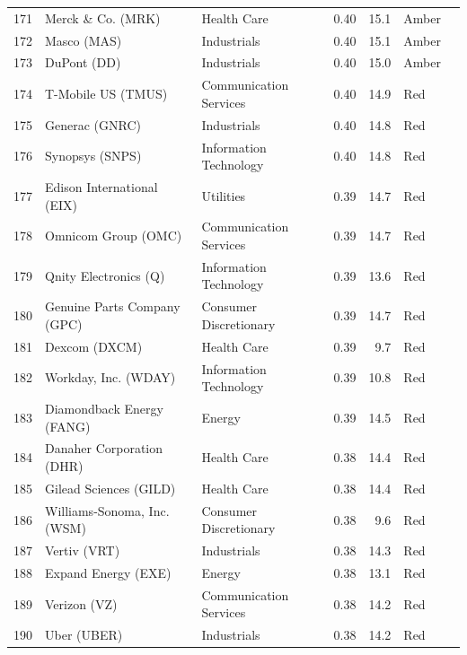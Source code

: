 \documentclass[11pt,a4paper]{article}
\begin{document}
{\begin{longtable}{r p{4.4cm} p{2.8cm} r r l l}
171 & Merck \& Co. (MRK) & Health Care & 0.40 & 15.1 & \cellcolor[HTML]{FFEB9C}Amber &  \\
172 & Masco (MAS) & Industrials & 0.40 & 15.1 & \cellcolor[HTML]{FFEB9C}Amber &  \\
173 & DuPont (DD) & Industrials & 0.40 & 15.0 & \cellcolor[HTML]{FFEB9C}Amber &  \\
174 & T-Mobile US (TMUS) & Communication Services & 0.40 & 14.9 & \cellcolor[HTML]{F4B6B6}Red &  \\
175 & Generac (GNRC) & Industrials & 0.40 & 14.8 & \cellcolor[HTML]{F4B6B6}Red &  \\
176 & Synopsys (SNPS) & Information Technology & 0.40 & 14.8 & \cellcolor[HTML]{F4B6B6}Red &  \\
177 & Edison International (EIX) & Utilities & 0.39 & 14.7 & \cellcolor[HTML]{F4B6B6}Red &  \\
178 & Omnicom Group (OMC) & Communication Services & 0.39 & 14.7 & \cellcolor[HTML]{F4B6B6}Red &  \\
179 & Qnity Electronics (Q) & Information Technology & 0.39 & 13.6 & \cellcolor[HTML]{F4B6B6}Red &  \\
180 & Genuine Parts Company (GPC) & Consumer Discretionary & 0.39 & 14.7 & \cellcolor[HTML]{F4B6B6}Red &  \\
181 & Dexcom (DXCM) & Health Care & 0.39 & 9.7 & \cellcolor[HTML]{F4B6B6}Red &  \\
182 & Workday, Inc. (WDAY) & Information Technology & 0.39 & 10.8 & \cellcolor[HTML]{F4B6B6}Red &  \\
183 & Diamondback Energy (FANG) & Energy & 0.39 & 14.5 & \cellcolor[HTML]{F4B6B6}Red &  \\
184 & Danaher Corporation (DHR) & Health Care & 0.38 & 14.4 & \cellcolor[HTML]{F4B6B6}Red &  \\
185 & Gilead Sciences (GILD) & Health Care & 0.38 & 14.4 & \cellcolor[HTML]{F4B6B6}Red &  \\
186 & Williams-Sonoma, Inc. (WSM) & Consumer Discretionary & 0.38 & 9.6 & \cellcolor[HTML]{F4B6B6}Red &  \\
187 & Vertiv (VRT) & Industrials & 0.38 & 14.3 & \cellcolor[HTML]{F4B6B6}Red &  \\
188 & Expand Energy (EXE) & Energy & 0.38 & 13.1 & \cellcolor[HTML]{F4B6B6}Red &  \\
189 & Verizon (VZ) & Communication Services & 0.38 & 14.2 & \cellcolor[HTML]{F4B6B6}Red &  \\
190 & Uber (UBER) & Industrials & 0.38 & 14.2 & \cellcolor[HTML]{F4B6B6}Red &  \\

\end{longtable}}
\end{document}
